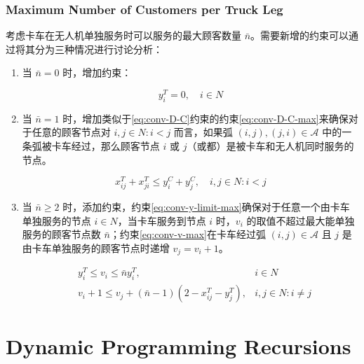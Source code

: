 \documentclass[fontset=none]{ctexart}
\begin{document}
\subsubsection{Maximum Number of Customers per Truck Leg}
考虑卡车在无人机单独服务时可以服务的最大顾客数量 $\bar{n}$。需要新增的约束可以通过将其分为三种情况进行讨论分析：

\begin{enumerate}
    \item 当 $\bar{n} = 0$ 时，增加约束：
    \begin{corollary}
        \begin{equation*}
            y_i^T = 0, \quad i \in N
        \end{equation*}
    \end{corollary}
    \item 当 $\bar{n} = 1$ 时，增加类似于\cref{eq:conv-D-C}约束的约束\cref{eq:conv-D-C-max}来确保对于任意的顾客节点对 $i, j \in N: i < j$ 而言，如果弧 $(i, j), (j, i) \in \mathcal{A}$ 中的一条弧被卡车经过，那么顾客节点 $i$ 或 $j$（或都）是被卡车和无人机同时服务的节点。
    \begin{corollary}
        \begin{equation}
            x_{ij}^T + x_{ji}^T \leq y_i^C + y_j^C, \quad i,j \in N: i <j \tag{10}\label{eq:conv-D-C-max}
        \end{equation}
    \end{corollary}
    \item 当 $\bar{n} \geq 2$ 时，添加约束，约束\cref{eq:conv-y-limit-max}确保对于任意一个由卡车单独服务的节点 $i \in N$，当卡车服务到节点 $i$ 时，$v_i$ 的取值不超过最大能单独服务的顾客节点数 $\bar{n}$；约束\cref{eq:conv-v-max}在卡车经过弧 $(i ,j) \in \mathcal{A}$ 且 $j$ 是由卡车单独服务的顾客节点时递增 $v_j = v_i + 1$。 
    \begin{corollary}
        \begin{align}
            & y_i^T \leq v_i \leq \bar{n}y_i^T, & i \in N \tag{11a} \label{eq:conv-y-limit-max} \\
            & v_i + 1 \leq v_j + (\bar{n} - 1)\left(2 - x_{ij}^T - y_j^T\right), & i,j \in N: i \neq j \tag{11b}\label{eq:conv-v-max}
        \end{align}
    \end{corollary}
\end{enumerate}

\section{Dynamic Programming Recursions}


\end{document}
